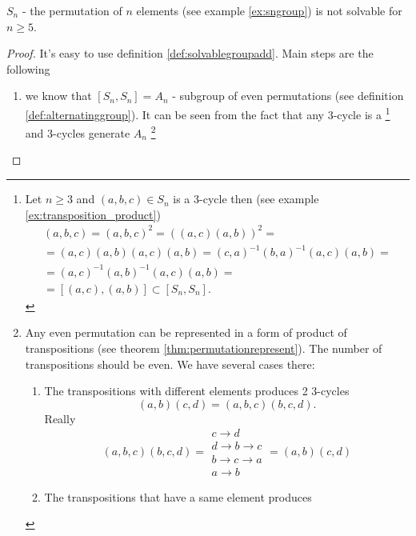 \begin{theorem}[$S_n$ solvability]
  $S_n$ - the permutation of $n$ elements (see example
  \ref{ex:sngroup}) is not solvable for $n \ge 5$. 
  \begin{proof}
    It's easy to use definition \ref{def:solvablegroupadd}.
    Main steps are the following
    \begin{enumerate}
      \item we know that $\left[S_n, S_n\right] = A_n$ - subgroup of
        even permutations (see definition
        \ref{def:alternatinggroup}). It can be seen from the fact that
        any 3-cycle is a 
        \footnote{
          Let $n \ge 3$ and $(a,b,c) \in S_n$ is a 3-cycle then
          (see example \ref{ex:transposition_product})
          \begin{eqnarray}
            (a,b,c) = (a,b,c)^2 =
            \left((a,c)(a,b)\right)^2 =
            \nonumber \\
            = (a,c)(a,b)(a,c)(a,b) =
            (c,a)^{-1}(b,a)^{-1}(a,c)(a,b) =
            \nonumber \\
            =
            (a,c)^{-1}(a,b)^{-1}(a,c)(a,b) =
            \nonumber \\
            =
            \left[
              (a,c),(a,b)
              \right] \subset \left[S_n, S_n\right].
            \nonumber
          \end{eqnarray}
        }
        and 3-cycles
        generate $A_n$
        \footnote{
          Any even permutation can be represented in a form of product
          of transpositions (see theorem
          \ref{thm:permutationrepresent}). The number of
          transpositions should be 
          even. We have several cases there:
          \begin{enumerate}
            \item The transpositions with different elements produces
              2 3-cycles
              \[
              (a,b)(c,d) = (a,b,c)(b,c,d).
              \]
              Really
              \[
              (a,b,c)(b,c,d) = 
              \begin{array}{c}
                c \to d \\
                d \to b \to c \\
                b \to c \to a \\
                a \to b 
              \end{array} =
              (a,b)(c,d)
              \]
            \item The transpositions that have a same element produces

\end{enumerate}}
\end{enumerate}
\end{proof}
\end{theorem}
